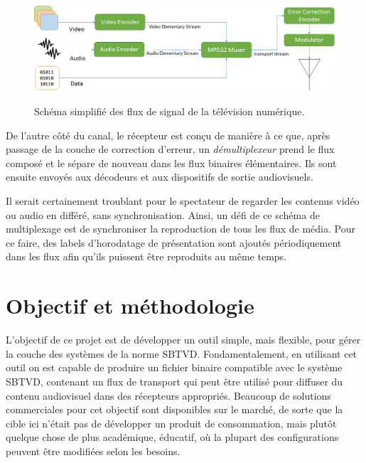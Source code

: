 \documentclass[12pt,a4paper]{article}
\begin{document}
 \begin{figure}[!h]
\centering
\caption{Schéma simplifié des flux de signal de la télévision numérique.}
\includegraphics[width=1\linewidth]{pictures/diagrama_blocos_tvd.png}
\label{fig:diagrama_blocos_tvd}
\end{figure}
 

De l'autre côté du canal, le récepteur est conçu de manière à ce que, après passage de la couche de correction d'erreur, un \textit{démultiplexeur} prend le flux composé et le sépare de nouveau dans les flux binaires élémentaires. Ils sont ensuite envoyés aux décodeurs et aux dispositifs de sortie audiovisuels.

Il serait certainement troublant pour le spectateur de regarder les contenus vidéo ou audio en différé, sans synchronisation. Ainsi, un défi de ce schéma de multiplexage est de synchroniser la reproduction de tous les flux de média. Pour ce faire, des labels d'horodatage de présentation sont ajoutés périodiquement dans les flux afin qu'ils puissent être reproduits au même temps.

\section{Objectif et méthodologie}

L'objectif de ce projet est de développer un outil simple, mais flexible, pour gérer la couche des systèmes de la norme SBTVD. Fondamentalement, en utilisant cet outil on est capable de produire un fichier binaire compatible avec le système SBTVD, contenant un flux de transport qui peut être utilisé pour diffuser du contenu audiovisuel  dans des récepteurs appropriés. Beaucoup de solutions commerciales pour cet objectif sont disponibles sur le marché, de sorte que la cible ici n'était pas de développer un produit de consommation, mais plutôt quelque chose de plus académique, éducatif, où la plupart des configurations peuvent être modifiées selon les besoins.
\end{document}

